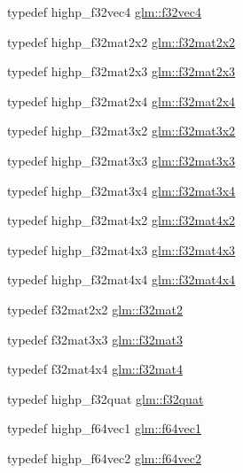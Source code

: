 \begin{CompactItemize}
\item 
typedef highp\_\-f32vec4 \hyperlink{group__gtc__type__precision_gb6254ab9d409cce6579d7dc75dd34114}{glm::f32vec4}
\item 
typedef highp\_\-f32mat2x2 \hyperlink{group__gtc__type__precision_g4eb16d89ecff72fa77f10c9a1e7ca475}{glm::f32mat2x2}
\item 
typedef highp\_\-f32mat2x3 \hyperlink{group__gtc__type__precision_g5ad96c3a7d4c81520d1f30bf5dcdc2b6}{glm::f32mat2x3}
\item 
typedef highp\_\-f32mat2x4 \hyperlink{group__gtc__type__precision_gba05bfeff59b12ea8e8ad2f6bfd8eece}{glm::f32mat2x4}
\item 
typedef highp\_\-f32mat3x2 \hyperlink{group__gtc__type__precision_g43fa9ba1875db74cba2cea33321a77ff}{glm::f32mat3x2}
\item 
typedef highp\_\-f32mat3x3 \hyperlink{group__gtc__type__precision_g56465dc40dd0e35221f00bdf44fb7c2e}{glm::f32mat3x3}
\item 
typedef highp\_\-f32mat3x4 \hyperlink{group__gtc__type__precision_g9d953c44b7bf260d2f2e61d73dc2ab08}{glm::f32mat3x4}
\item 
typedef highp\_\-f32mat4x2 \hyperlink{group__gtc__type__precision_g6aee56c6561190811699bfd2b1cd0d57}{glm::f32mat4x2}
\item 
typedef highp\_\-f32mat4x3 \hyperlink{group__gtc__type__precision_g5102ae88531e072efe57e75354e10347}{glm::f32mat4x3}
\item 
typedef highp\_\-f32mat4x4 \hyperlink{group__gtc__type__precision_g939fc7fbeb62575aca543d3a0342d807}{glm::f32mat4x4}
\item 
typedef f32mat2x2 \hyperlink{group__gtc__type__precision_g5a8b82f5ef3eb6355640d57466793d9b}{glm::f32mat2}
\item 
typedef f32mat3x3 \hyperlink{group__gtc__type__precision_gf8d666dea6f652c21f0c1515ce522090}{glm::f32mat3}
\item 
typedef f32mat4x4 \hyperlink{group__gtc__type__precision_g6bf98d2ab0eb4889e5190c26e1853292}{glm::f32mat4}
\item 
typedef highp\_\-f32quat \hyperlink{group__gtc__type__precision_gfc69e0f1b9ac1a001bb4b1b9710d4f92}{glm::f32quat}
\item 
typedef highp\_\-f64vec1 \hyperlink{group__gtc__type__precision_g55bdb96a24de2e3531c74310b12ba5d7}{glm::f64vec1}
\item 
typedef highp\_\-f64vec2 \hyperlink{group__gtc__type__precision_g3f131d462df8154918f93ba1ac7cc4bd}{glm::f64vec2}
\item 

\end{CompactItemize}
